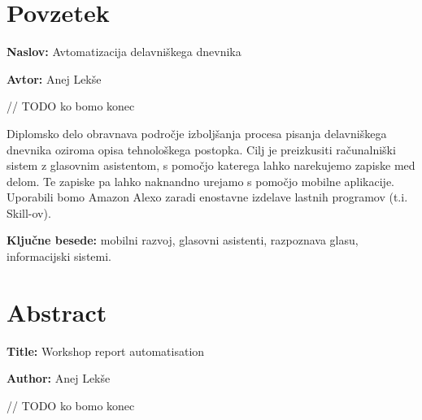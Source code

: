 \documentclass[a4paper, 12pt]{book}
\newcommand{\ttitle}{Avtomatizacija delavniškega dnevnika}
\newcommand{\ttitleEn}{Workshop report automatisation}
\newcommand{\tauthor}{Anej Lekše}
\newcommand{\tkeywords}{mobilni razvoj, glasovni asistenti, razpoznava glasu, informacijski sistemi}
\newcommand{\clearemptydoublepage}{\newpage{\pagestyle{empty}\cleardoublepage}}
\begin{document}
\chapter*{Povzetek}

\noindent\textbf{Naslov:} \ttitle
\bigskip

\noindent\textbf{Avtor:} \tauthor
\bigskip


// TODO ko bomo konec

\noindent Diplomsko delo obravnava področje izboljšanja procesa pisanja delavniškega dnevnika oziroma opisa tehnološkega postopka.
Cilj je preizkusiti računalniški sistem z glasovnim asistentom, s pomočjo katerega lahko narekujemo zapiske med delom. 
Te zapiske pa lahko naknandno urejamo s pomočjo mobilne aplikacije.
Uporabili bomo Amazon Alexo zaradi enostavne izdelave lastnih programov (t.i. Skill-ov).

\bigskip

\noindent\textbf{Ključne besede:} \tkeywords.
\clearemptydoublepage

\chapter*{Abstract}

\noindent\textbf{Title:} \ttitleEn
\bigskip

\noindent\textbf{Author:} \tauthor
\bigskip

// TODO ko bomo konec
\end{document}
